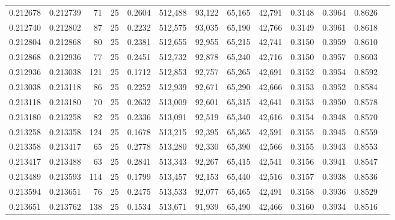 \begin{tabular}{rrrrrrrrrrrrr}
0.212678 & 0.212739 &    71 &  25 &                                     0.2604 & 512,488 &  93,122 &  65,165 &  42,791 & 0.3148 & 0.3964 & 0.8626 \\
0.212740 & 0.212802 &    87 &  25 &                                     0.2232 & 512,575 &  93,035 &  65,190 &  42,766 & 0.3149 & 0.3961 & 0.8618 \\
0.212804 & 0.212868 &    80 &  25 &                                     0.2381 & 512,655 &  92,955 &  65,215 &  42,741 & 0.3150 & 0.3959 & 0.8610 \\
0.212868 & 0.212936 &    77 &  25 &                                     0.2451 & 512,732 &  92,878 &  65,240 &  42,716 & 0.3150 & 0.3957 & 0.8603 \\
0.212936 & 0.213038 &   121 &  25 &                                     0.1712 & 512,853 &  92,757 &  65,265 &  42,691 & 0.3152 & 0.3954 & 0.8592 \\
0.213038 & 0.213118 &    86 &  25 &                                     0.2252 & 512,939 &  92,671 &  65,290 &  42,666 & 0.3153 & 0.3952 & 0.8584 \\
0.213118 & 0.213180 &    70 &  25 &                                     0.2632 & 513,009 &  92,601 &  65,315 &  42,641 & 0.3153 & 0.3950 & 0.8578 \\
0.213180 & 0.213258 &    82 &  25 &                                     0.2336 & 513,091 &  92,519 &  65,340 &  42,616 & 0.3154 & 0.3948 & 0.8570 \\
0.213258 & 0.213358 &   124 &  25 &                                     0.1678 & 513,215 &  92,395 &  65,365 &  42,591 & 0.3155 & 0.3945 & 0.8559 \\
0.213358 & 0.213417 &    65 &  25 &                                     0.2778 & 513,280 &  92,330 &  65,390 &  42,566 & 0.3155 & 0.3943 & 0.8553 \\
0.213417 & 0.213488 &    63 &  25 &                                     0.2841 & 513,343 &  92,267 &  65,415 &  42,541 & 0.3156 & 0.3941 & 0.8547 \\
0.213489 & 0.213593 &   114 &  25 &                                     0.1799 & 513,457 &  92,153 &  65,440 &  42,516 & 0.3157 & 0.3938 & 0.8536 \\
0.213594 & 0.213651 &    76 &  25 &                                     0.2475 & 513,533 &  92,077 &  65,465 &  42,491 & 0.3158 & 0.3936 & 0.8529 \\
0.213651 & 0.213762 &   138 &  25 &                                     0.1534 & 513,671 &  91,939 &  65,490 &  42,466 & 0.3160 & 0.3934 & 0.8516 \\

\end{tabular}
